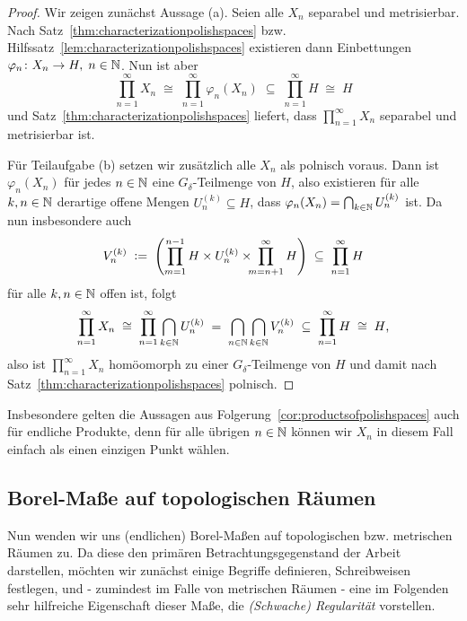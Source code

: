 \documentclass[../main/main.tex]{subfiles}
\begin{document}
	\begin{proof}
		Wir zeigen zunächst Aussage (a). Seien alle $X_n$ separabel und metrisierbar. Nach Satz~\ref{thm:characterizationpolishspaces} bzw. 
		Hilfssatz~\ref{lem:characterizationpolishspaces} existieren dann Einbettungen $\varphi_n \colon X_n \to H, \; n \in \mathbb{N}$. Nun ist aber 
		\[ \prod_{n=1}^{\infty} X_n \; \cong \; \prod_{n=1}^{\infty} \varphi_n(X_n) \; \subseteq \; \prod_{n=1}^{\infty} H \; \cong \; H \]
		und Satz~\ref{thm:characterizationpolishspaces} liefert, dass $\prod_{n=1}^{\infty} X_n$ separabel und metrisierbar ist.
		
		Für Teilaufgabe (b) setzen wir zusätzlich alle $X_n$ als polnisch voraus. Dann ist $\varphi_n(X_n)$ für jedes $n \in \mathbb{N}$ eine $G_{\delta}$-Teilmenge von $H$, also
		existieren für alle $k, n \in \mathbb{N}$ derartige offene Mengen $U_n^{(k)} \subseteq H$, dass $\varphi_n(X_n) = \bigcap_{k \in \mathbb{N}} U_n^{(k)}$ ist. Da nun insbesondere auch
		\[ V_n^{(k)} \; \vcentcolon = \; \left( \prod_{m=1}^{n-1} H \times U_n^{(k)} \times \!\!\! \prod_{m=n+1}^{\infty} H \right) \; \subseteq \; \prod_{n=1}^{\infty} H \]
		für alle $k, n \in \mathbb{N}$ offen ist, folgt
		\[ \prod_{n=1}^{\infty} X_n \; \cong \; \prod_{n=1}^{\infty} \bigcap_{k \in \mathbb{N}} U_n^{(k)} \; = \; \bigcap_{n \in \mathbb{N}} \bigcap_{k \in \mathbb{N}} V_n^{(k)} \; \subseteq \; \prod_{n=1}^{\infty} H \; \cong \; H \text{,} \]
		also ist $\prod_{n=1}^{\infty} X_n$ homöomorph zu einer $G_{\delta}$-Teilmenge von $H$ und damit nach Satz~\ref{thm:characterizationpolishspaces} polnisch.
	\end{proof}

	\begin{Bemerkung}
		Insbesondere gelten die Aussagen aus Folgerung~\ref{cor:productsofpolishspaces} auch für endliche Produkte, denn für alle übrigen $n \in \mathbb{N}$ können wir $X_n$ in diesem Fall einfach als einen einzigen Punkt wählen.
	\end{Bemerkung}
	
	\subsection{Borel-Maße auf topologischen Räumen}
	
	Nun wenden wir uns (endlichen) Borel-Maßen auf topologischen bzw. metrischen Räumen zu. Da diese den primären Betrachtungsgegenstand der
	Arbeit darstellen, möchten wir zunächst einige Begriffe definieren, Schreibweisen festlegen, und - zumindest im Falle von metrischen Räumen - eine im Folgenden sehr 
	hilfreiche Eigenschaft dieser Maße, die \emph{(Schwache) Regularität} vorstellen.
	
\end{document}
